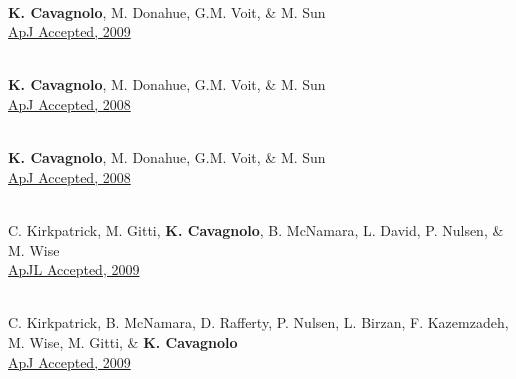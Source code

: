 \documentclass[12pt]{cv}
\begin{document}
\begin{llist}


{}\\
{\bf K. Cavagnolo}, M. Donahue, G.M. Voit, \& M. Sun\\
\href{http://adsabs.harvard.edu/abs/2009ApJS..182...12C}{ApJ Accepted, 2009}

{}\\
{\bf K. Cavagnolo}, M. Donahue, G.M. Voit, \& M. Sun\\
\href{http://adsabs.harvard.edu/abs/2008ApJ...683L.107C}{ApJ Accepted, 2008}

{}\\
{\bf K. Cavagnolo}, M. Donahue, G.M. Voit, \& M. Sun\\
\href{http://adsabs.harvard.edu/abs/2008ApJ...682..821C}{ApJ Accepted, 2008}



{}\\
C. Kirkpatrick, M. Gitti, {\bf K. Cavagnolo}, B. McNamara, L. David, P. Nulsen, \& M. Wise\\
\href{http://adsabs.harvard.edu/abs/2009arXiv0909.2252K}{ApJL Accepted, 2009}

{}\\
C. Kirkpatrick, B. McNamara, D. Rafferty, P. Nulsen, L. Birzan, F. Kazemzadeh, M. Wise, M. Gitti, \& {\bf K. Cavagnolo}\\
\href{http://adsabs.harvard.edu/abs/2009ApJ...697..867K}{ApJ Accepted, 2009}


\end{llist}
\end{document}
